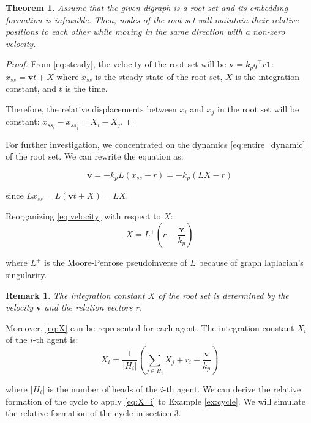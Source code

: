 \documentclass[letterpaper, 10 pt, conference]{ieeeconf}  %
\newtheorem{theorem}{Theorem}[section]
\newtheorem{remark}{Remark}
\begin{document}
\begin{theorem}
    Assume that the given digraph is a root set and its embedding formation is infeasible. Then, nodes of the root set will maintain their relative positions to each other while moving in the same direction with a non-zero velocity.
\end{theorem}

\begin{proof}
    From \eqref{eq:steady}, the velocity of the root set will be \(\mathbf{v} = k_p q^\top r \mathbf{1}\): \(x_{ss} = \mathbf{v} t + X \) where \(x_{ss}\) is the steady state of the root set, \(X\) is the integration constant, and \(t\) is the time.  

    Therefore, the relative displacements between \(x_i\) and \(x_j\) in the root set will be constant: \(x_{ss_i} - x_{ss_j} = X_i - X_j\). 
\end{proof}

For further investigation, we concentrated on the dynamics \eqref{eq:entire_dynamic} of the root set. We can rewrite the equation as:

\begin{equation}
    \mathbf{v} = -k_p L (x_{ss} - r) = -k_p (L X - r)
    \label{eq:velocity}
\end{equation}

\noindent since \(L x_{ss} = L(\mathbf{v}t + X) = LX\).


Reorganizing \eqref{eq:velocity} with respect to \(X\):
\begin{equation}
    X = L^{+} \left( r - \frac{\mathbf{v}}{k_p} \right)
    \label{eq:X}
\end{equation}

\noindent where \(L^{+}\) is the Moore-Penrose pseudoinverse of \(L\) because of graph laplacian's singularity.

\begin{remark}
    The integration constant \(X\) of the root set is determined by the velocity \(\mathbf{v}\) and the relation vectors \(r\).
\end{remark}

Moreover, \eqref{eq:X} can be represented for each agent. The integration constant \(X_i\) of the \(i\)-th agent is:
\begin{equation}
    X_i = \frac{1}{|H_i|} \left( \sum_{j \in H_i} X_j + r_{i} - \frac{\mathbf{v}}{k_p} \right)
    \label{eq:X_i}
\end{equation}

\noindent where \(|H_i|\) is the number of heads of the \(i\)-th agent. We can derive the relative formation of the cycle to apply \eqref{eq:X_i} to Example \ref{ex:cycle}. We will simulate the relative formation of the cycle in section 3. 
\end{document}
